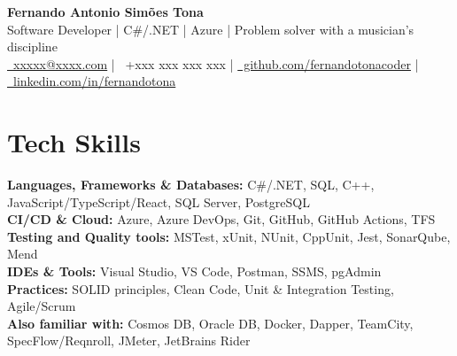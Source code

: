 \documentclass[a4paper,10pt]{article}
\begin{document}
\begin{center}
  {\Large \textbf{Fernando Antonio Simões Tona}}\\[4pt]
  Software Developer | C\#/.NET | Azure | Problem solver with a musician’s discipline\\[4pt]
  {\small
  \href{mailto:xxxxx@xxxx.com}{\faEnvelope\ xxxxx@xxxx.com} | \faMobile\ +xxx xxx xxx xxx | \href{https://github.com/fernandotonacoder}{\faGithub\ github.com/fernandotonacoder} | \href{https://www.linkedin.com/in/fernandotona/}{\faLinkedin\ linkedin.com/in/fernandotona}
  }
\end{center}


\section{Tech Skills}
\vspace{2pt}
{\small
\textbf{Languages, Frameworks \& Databases:} C\#/.NET, SQL, C++, JavaScript/TypeScript/React, SQL Server, PostgreSQL\\[2pt]
\textbf{CI/CD \& Cloud:} Azure, Azure DevOps, Git, GitHub, GitHub Actions, TFS\\[2pt]
\textbf{Testing and Quality tools:} MSTest, xUnit, NUnit, CppUnit, Jest, SonarQube, Mend\\[2pt]
\textbf{IDEs \& Tools:} Visual Studio, VS Code, Postman, SSMS, pgAdmin\\[2pt]
\textbf{Practices:} SOLID principles, Clean Code, Unit \& Integration Testing, Agile/Scrum\\[2pt]
\textbf{Also familiar with:} Cosmos DB, Oracle DB, Docker, Dapper, TeamCity, SpecFlow/Reqnroll, JMeter, JetBrains Rider
}
\end{document}
